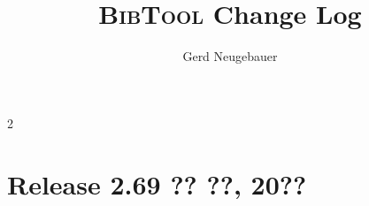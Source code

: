 \documentclass[11pt,a4paper]{scrartcl}
\newenvironment{Developers}{}{}
\newcommand\Developer[3]{}
\newcommand\BibTool{\textsc{BibTool}}
\newenvironment{Releases}{\begin{multicols}2\RaggedRight}{\end{multicols}}
\newenvironment{Release}[2]{%
  \def\tmp{#2}%
  \section*{Release #1 \ifx\tmp\empty\else{\normalsize[#2]}\fi}
  \begin{itemize}
}{\end{itemize}}
\begin{document}

\title{\BibTool{} Change Log}
\author{Gerd Neugebauer}
\date{}
\maketitle

\begin{Developers}
  \Developer{gene}{Gerd Neugebauer}{gene@gerd-neugebauer.de}
\end{Developers}

\begin{Releases}

 \begin{Release}{2.69}{?? ??, 20??}

 \end{Release}


\end{Releases}
\end{document}
